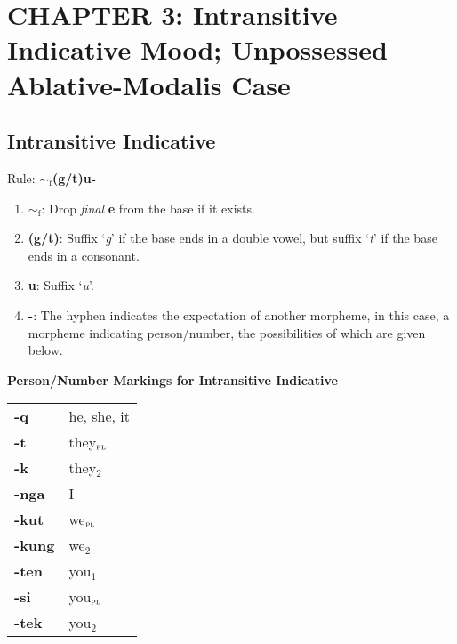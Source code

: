 \documentclass{article}
\begin{document}
\section{CHAPTER 3: Intransitive Indicative Mood; Unpossessed Ablative-Modalis Case}

\subsection{Intransitive Indicative}

\noindent Rule: \textbf{${\sim}_\text{f}$(g/t)u-}

\begin{enumerate}
\item \textbf{${\sim}_\text{f}$}: Drop \textit{final} \textbf{e} from the base if it exists.
\item \textbf{(g/t)}: Suffix `\textit{g}' if the base ends in a double vowel, but suffix `\textit{t}' if the base ends in a consonant.
\item \textbf{u}: Suffix `\textit{u}'.
\item \textbf{-}: The hyphen indicates the expectation of another morpheme, in this case, a morpheme indicating person/number, the possibilities of which are given below.
\end{enumerate}

\textbf{Person/Number Markings for Intransitive Indicative}

\begin{tabular}{ l l }
\textbf{-q} & he, she, it \\ 
\textbf{-t} & they$_\text{\textsc{pl}}$ \\  
\textbf{-k} & they$_\text{2}$ \\
\textbf{-nga} & I \\
\textbf{-kut} & we$_\text{\textsc{pl}}$ \\  
\textbf{-kung} & we$_\text{2}$ \\  
\textbf{-ten} & you$_\text{1}$ \\
\textbf{-si} & you$_\text{\textsc{pl}}$ \\
\textbf{-tek} & you$_\text{2}$
\end{tabular}
\end{document}
